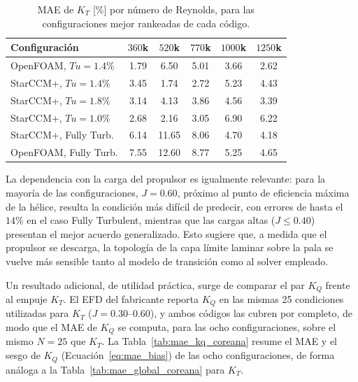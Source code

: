 \begin{table}[htpb]
\centering
\small
\caption{MAE de $K_T$ [\%] por número de Reynolds, para las configuraciones mejor
rankeadas de cada código.}
\label{tab:mae_re_coreana}
\begin{tabular}{lccccc}
\hline
Configuración & $360$k & $520$k & $770$k & $1000$k & $1250$k \\
\hline
OpenFOAM, $Tu=1.4\%$   & 1.79 & 6.50 & 5.01 & 3.66 & 2.62 \\
StarCCM+, $Tu=1.4\%$   & 3.45 & 1.74 & 2.72 & 5.23 & 4.43 \\
StarCCM+, $Tu=1.8\%$   & 3.14 & 4.13 & 3.86 & 4.56 & 3.39 \\
StarCCM+, $Tu=1.0\%$   & 2.68 & 2.16 & 3.05 & 6.90 & 6.22 \\
StarCCM+, Fully Turb.  & 6.14 & 11.65 & 8.06 & 4.70 & 4.18 \\
OpenFOAM, Fully Turb.  & 7.55 & 12.60 & 8.77 & 5.25 & 4.65 \\
\hline
\end{tabular}
\end{table}

La dependencia con la carga del propulsor es igualmente relevante: para la mayoría de
las configuraciones, $J = 0.60$, próximo al punto de eficiencia máxima de la hélice, resulta la condición más difícil de predecir, con errores de hasta el $14\%$ en el
caso Fully Turbulent, mientras que las cargas altas ($J \leq 0.40$) presentan el
mejor acuerdo generalizado. Esto sugiere que, a medida que el propulsor se descarga,
la topología de la capa límite laminar sobre la pala se vuelve más sensible tanto al
modelo de transición como al solver empleado.

Un resultado adicional, de utilidad práctica, surge de comparar el par $K_Q$ frente al
empuje $K_T$. El EFD del fabricante reporta $K_Q$ en las mismas 25 condiciones
utilizadas para $K_T$ ($J=0.30$--$0.60$), y ambos códigos las cubren por completo, de
modo que el MAE de $K_Q$ se computa, para las ocho configuraciones, sobre el mismo
$N=25$ que $K_T$. La Tabla~\ref{tab:mae_kq_coreana} resume el MAE y el sesgo de $K_Q$
(Ecuación~\ref{eq:mae_bias}) de las ocho configuraciones, de forma análoga a la
Tabla~\ref{tab:mae_global_coreana} para $K_T$.

